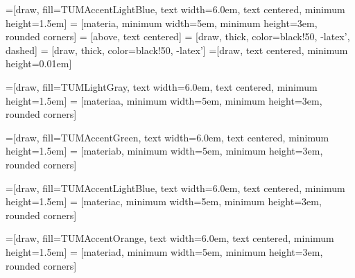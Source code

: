 
=[draw, fill=TUMAccentLightBlue, text width=6.0em, text centered,
minimum height=1.5em]
 = [materia, minimum width=5em,
minimum height=3em, rounded corners]
 = [above, text centered]
 = [draw, thick, color=black!50, -latex', dashed]
 = [draw, thick, color=black!50, -latex']
=[draw, text centered, minimum height=0.01em]

\newcommand{\blockdist}{1.3}
\newcommand{\edgedist}{1.5}


=[draw, fill=TUMLightGray, text width=6.0em, text centered,
minimum height=1.5em]
 = [materiaa, minimum width=5em,
minimum height=3em, rounded corners]
\newcommand{\defnodea}[2]{node (p#1) [practicaa]
	{{\scriptsize\textit{#2}}}}

=[draw, fill=TUMAccentGreen, text width=6.0em, text centered,
minimum height=1.5em]
 = [materiab, minimum width=5em,
minimum height=3em, rounded corners]
\newcommand{\defnodeb}[2]{node (p#1) [practicab]
	{{\scriptsize\textit{#2}}}}

=[draw, fill=TUMAccentLightBlue, text width=6.0em, text centered,
minimum height=1.5em]
 = [materiac, minimum width=5em,
minimum height=3em, rounded corners]
\newcommand{\defnodec}[2]{node (p#1) [practicac]
	{{\scriptsize\textit{#2}}}}

=[draw, fill=TUMAccentOrange, text width=6.0em, text centered,
minimum height=1.5em]
 = [materiad, minimum width=5em,
minimum height=3em, rounded corners]
\newcommand{\defnoded}[2]{node (p#1) [practicad]
	{{\scriptsize\textit{#2}}}}

\newcommand{\background}[5]{%
	\begin{pgfonlayer}{background}
		\path (#1.west |- #2.north)+(-0.5,0.5) node (a1) {};
		\path (#3.east |- #4.south)+(+0.5,-0.25) node (a2) {};
		\path[fill=white,rounded corners, draw=black!50, dashed]
		(a1) rectangle (a2);
		\path (a1.east |- a1.south)+(0.8,0.2) node (u1)[texto]
		{\normalsize\textit{#5}};
\end{pgfonlayer}}

